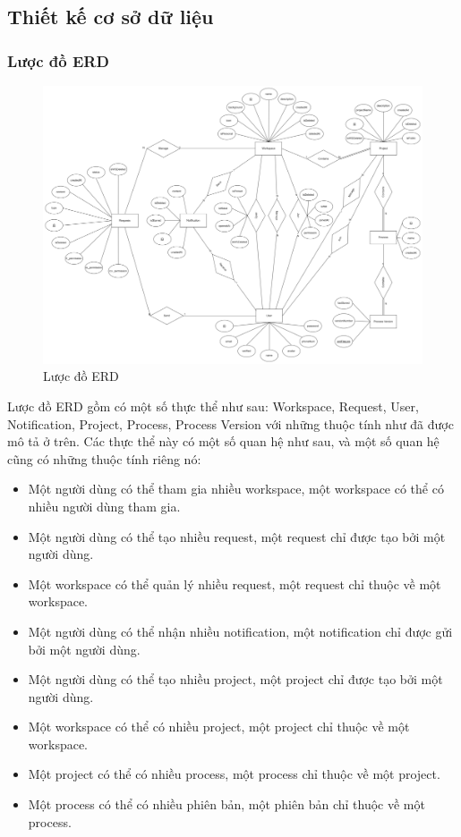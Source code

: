 \subsection{Thiết kế cơ sở dữ liệu}
\subsubsection{Lược đồ ERD}
\begin{figure}[H]
        \centering
        \includegraphics[width=\textwidth]{Content/Phân tích và thiết kế hệ thống/images/erd.png}
        \vspace{0.5cm}
        \caption{Lược đồ ERD}
        \label{fig:Lược đồ ERD}
\end{figure}
\par
Lược đồ ERD gồm có một số thực thể như sau: Workspace, Request,
User, Notification, Project, Process, Process Version với những
thuộc tính như đã được mô tả ở trên. Các thực thể này có một số
quan hệ như sau, và một số quan hệ cũng có những thuộc tính riêng nó:
\begin{itemize}
    \item Một người dùng có thể tham gia nhiều workspace, một
    workspace có thể có nhiều người dùng tham gia.
    \item Một người dùng có thể tạo nhiều request, một request
    chỉ được tạo bởi một người dùng.
    \item Một workspace có thể quản lý nhiều request, một request
    chỉ thuộc về một workspace.
    \item Một người dùng có thể nhận nhiều notification, một
    notification chỉ được gửi bởi một người dùng.
    \item Một người dùng có thể tạo nhiều project, một project
    chỉ được tạo bởi một người dùng.
    \item Một workspace có thể có nhiều project, một project
    chỉ thuộc về một workspace.
    \item Một project có thể có nhiều process, một process
    chỉ thuộc về một project.
    \item Một process có thể có nhiều phiên bản, một phiên bản
    chỉ thuộc về một process.
\end{itemize}
